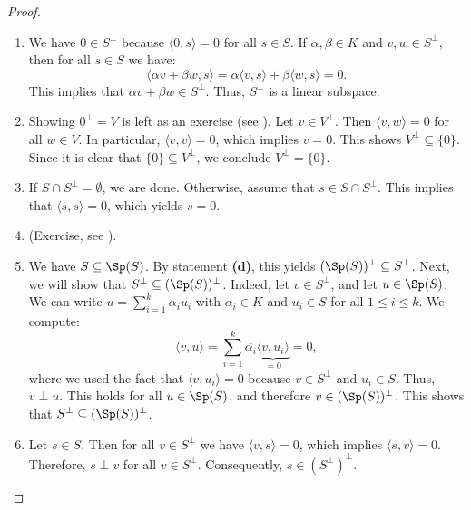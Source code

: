 \begin{proof}
\begin{enumerate}[label=\textbf{(\alph*)}]
    \item We have $0 \in S^\perp$ because $\langle 0, s \rangle = 0$ for all $s \in S$.
    If $\alpha, \beta \in K$ and $v, w \in S^\perp$, then for all $s \in S$ we have:
    \[
        \langle \alpha v + \beta w, s \rangle = \alpha \langle v, s \rangle + \beta \langle w, s \rangle = 0.
    \]
    This implies that $\alpha v + \beta w \in S^\perp$. Thus, $S^\perp$ is a linear subspace.
    
    \item Showing $0^\perp = V$ is left as an exercise (see ). Let $v \in V^\perp$. Then $\langle v, w \rangle = 0$ for all $w \in V$. In particular, $\langle v, v \rangle = 0$, which implies $v = 0$. This shows $V^\perp \subseteq \{0\}$. Since it is clear that $\{0\} \subseteq V^\perp$, we conclude $V^\perp = \{0\}$.
    
    \item If $S \cap S^\perp = \emptyset$, we are done. Otherwise, assume that $s \in S \cap S^\perp$. This implies that $\langle s, s \rangle = 0$, which yields $s = 0$.
    
    \item (Exercise, see ).
    
    \item We have $S \subseteq \Sp(S)$. By statement \textbf{(d)}, this yields $(\Sp(S))^\perp \subseteq S^\perp$.
    Next, we will show that $S^\perp \subseteq (\Sp(S))^\perp$. Indeed, let $v \in S^\perp$, and let $u \in \Sp(S)$. We can write $u = \sum_{i=1}^k \alpha_i u_i$ with $\alpha_i \in K$ and $u_i \in S$ for all $1 \leq i \leq k$. We compute:
    \[
        \langle v, u \rangle = \sum_{i=1}^k \overline{\alpha_i} \underbrace{\langle v, u_i \rangle}_{= 0} = 0,
    \]
    where we used the fact that $\langle v, u_i \rangle = 0$ because $v \in S^\perp$ and $u_i \in S$. Thus, $v \perp u$. This holds for all $u \in \Sp(S)$, and therefore $v \in (\Sp(S))^\perp$. This shows that $S^\perp \subseteq (\Sp(S))^\perp$.
    
    \item Let $s \in S$. Then for all $v \in S^\perp$ we have $\langle v, s \rangle = 0$, which implies $\langle s, v \rangle = 0$. Therefore, $s \perp v$ for all $v \in S^\perp$. Consequently, $s \in (S^\perp)^\perp$.
\end{enumerate}
\end{proof}

